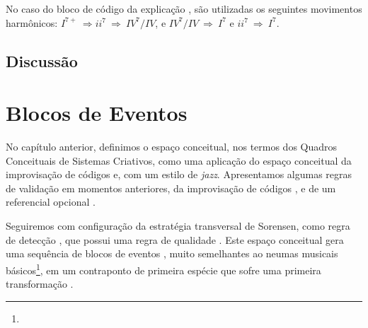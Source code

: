 No caso do bloco de código da explicação , são utilizadas os seguintes movimentos harmônicos: $I^{7+}~\Rightarrow ii^{7}~\Rightarrow~IV^{7}/IV$, e $IV^{7}/IV~\Rightarrow~I^{7}$ e $ii^{7}~\Rightarrow~I^{7}$.

\subsection*{Discussão}



\section{Blocos de Eventos}\label{sec:eventos}

No capítulo anterior, definimos o espaço conceitual, nos termos dos Quadros Conceituais de Sistemas Criativos, como uma aplicação do espaço conceitual da improvisação de códigos e, com um estilo de \emph{jazz}. Apresentamos algumas regras de validação em momentos anteriores, da improvisação de códigos , e de um referencial opcional .

Seguiremos com configuração da estratégia transversal de Sorensen, como regra de detecção , que possui uma regra de qualidade  . Este espaço conceitual gera uma sequência de blocos de eventos , muito semelhantes ao neumas musicais básicos\footnote{}, em um contraponto de primeira espécie que sofre uma primeira transformação . 


